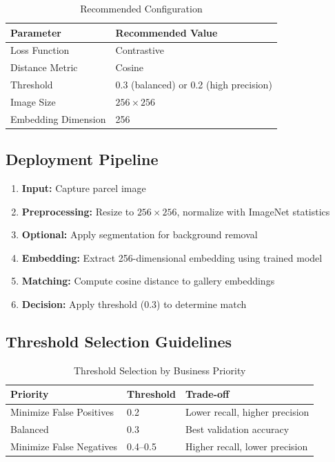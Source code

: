 \documentclass[12pt,a4paper]{article}
\begin{document}
\begin{table}[H]
\centering
\caption{Recommended Configuration}
\label{tab:recommendations}
\begin{tabular}{ll}
\toprule
\textbf{Parameter} & \textbf{Recommended Value} \\
\midrule
Loss Function & Contrastive \\
Distance Metric & Cosine \\
Threshold & 0.3 (balanced) or 0.2 (high precision) \\
Image Size & $256 \times 256$ \\
Embedding Dimension & 256 \\
\bottomrule
\end{tabular}
\end{table}

\subsection{Deployment Pipeline}

\begin{enumerate}
    \item \textbf{Input:} Capture parcel image
    \item \textbf{Preprocessing:} Resize to $256 \times 256$, normalize with ImageNet statistics
    \item \textbf{Optional:} Apply segmentation for background removal
    \item \textbf{Embedding:} Extract 256-dimensional embedding using trained model
    \item \textbf{Matching:} Compute cosine distance to gallery embeddings
    \item \textbf{Decision:} Apply threshold (0.3) to determine match
\end{enumerate}

\subsection{Threshold Selection Guidelines}

\begin{table}[H]
\centering
\caption{Threshold Selection by Business Priority}
\label{tab:threshold_guidelines}
\begin{tabular}{lll}
\toprule
\textbf{Priority} & \textbf{Threshold} & \textbf{Trade-off} \\
\midrule
Minimize False Positives & 0.2 & Lower recall, higher precision \\
Balanced & 0.3 & Best validation accuracy \\
Minimize False Negatives & 0.4--0.5 & Higher recall, lower precision \\
\bottomrule
\end{tabular}
\end{table}
\end{document}
